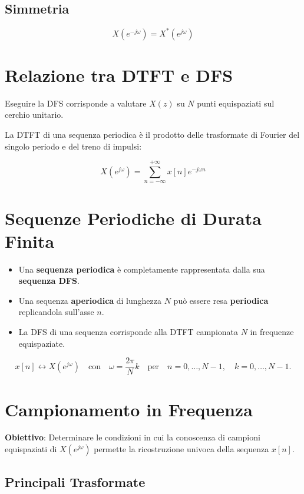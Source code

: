 \subsection*{Simmetria}
\[
X(e^{-j\omega}) = X^*(e^{j\omega})
\]

\section*{Relazione tra DTFT e DFS}

Eseguire la DFS corrisponde a valutare \( X(z) \) su \( N \) punti equispaziati sul cerchio unitario.

La DTFT di una sequenza periodica è il prodotto delle trasformate di Fourier del singolo periodo e del treno di impulsi:

\[
X(e^{j\omega}) = \sum_{n=-\infty}^{+\infty} x[n] e^{-j\omega n}
\]

\section*{Sequenze Periodiche di Durata Finita}

\begin{itemize}
    \item Una \textbf{sequenza periodica} è completamente rappresentata dalla sua \textbf{sequenza DFS}.
    \item Una sequenza \textbf{aperiodica} di lunghezza \( N \) può essere resa \textbf{periodica} replicandola sull'asse \( n \).
    \item La DFS di una sequenza corrisponde alla DTFT campionata \( N \) in frequenze equispaziate.
\end{itemize}

\[
x[n] \leftrightarrow X(e^{j\omega}) \quad \text{con} \quad \omega = \frac{2\pi}{N}k \quad \text{per} \quad n=0, \dots, N-1, \quad k=0, \dots, N-1.
\]

\section*{Campionamento in Frequenza}

\textbf{Obiettivo}: Determinare le condizioni in cui la conoscenza di campioni equispaziati di \( X(e^{j\omega}) \) permette la ricostruzione univoca della sequenza \( x[n] \).

\subsection*{Principali Trasformate}

